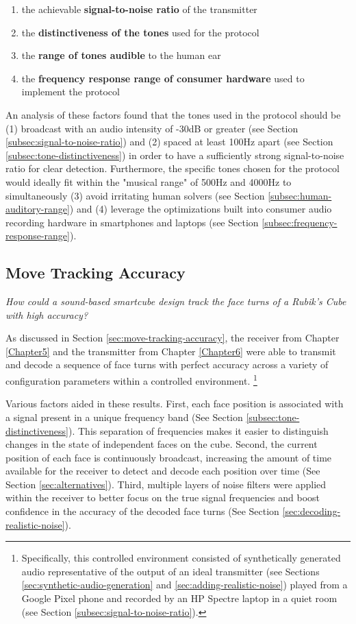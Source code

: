 \begin{enumerate}
    \item the achievable \textbf{signal-to-noise ratio} of the transmitter
    \item the \textbf{distinctiveness of the tones} used for the protocol
    \item the \textbf{range of tones audible} to the human ear
    \item the \textbf{frequency response range of consumer hardware} used to implement the protocol
\end{enumerate}

An analysis of these factors found that the tones used in the protocol
should be (1) broadcast with an audio intensity of -30dB or greater
(see Section \ref{subsec:signal-to-noise-ratio}) and (2) spaced at
least 100Hz apart (see Section \ref{subsec:tone-distinctiveness}) in
order to have a sufficiently strong signal-to-noise ratio for clear
detection. Furthermore, the specific tones chosen for the protocol
would ideally fit within the "musical range" of 500Hz and 4000Hz to
simultaneously (3) avoid irritating human solvers (see Section
\ref{subsec:human-auditory-range}) and (4) leverage the optimizations
built into consumer audio recording hardware in smartphones and laptops
(see Section \ref{subsec:frequency-response-range}).

\subsection{Move Tracking Accuracy}
\label{subsec:answer-accuracy}

\emph{How could a sound-based smartcube design track the face turns of
a Rubik's Cube with high accuracy?}

As discussed in Section \ref{sec:move-tracking-accuracy}, the receiver
from Chapter \ref{Chapter5} and the transmitter from Chapter
\ref{Chapter6} were able to transmit and decode a sequence of face
turns with perfect accuracy across a variety of configuration
parameters within a controlled environment. \footnote{Specifically,
this controlled environment consisted of synthetically generated audio
representative of the output of an ideal transmitter (see Sections
\ref{sec:synthetic-audio-generation} and
\ref{sec:adding-realistic-noise}) played from a Google Pixel phone and
recorded by an HP Spectre laptop in a quiet room (see Section
\ref{subsec:signal-to-noise-ratio}).}

Various factors aided in these results. First, each face position is
associated with a signal present in a unique frequency band (See
Section \ref{subsec:tone-distinctiveness}). This separation of
frequencies makes it easier to distinguish changes in the state of
independent faces on the cube. Second, the current position of each
face is continuously broadcast, increasing the amount of time available
for the receiver to detect and decode each position over time (See
Section \ref{sec:alternatives}). Third, multiple layers of noise
filters were applied within the receiver to better focus on the true
signal frequencies and boost confidence in the accuracy of the decoded
face turns (See Section \ref{sec:decoding-realistic-noise}).


